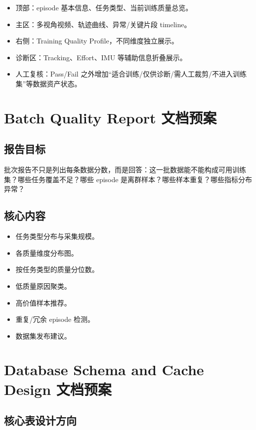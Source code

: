 \documentclass[UTF8,zihao=-4]{ctexart}
\begin{document}
\begin{itemize}
  \item 顶部：episode 基本信息、任务类型、当前训练质量总览。
  \item 主区：多视角视频、轨迹曲线、异常/关键片段 timeline。
  \item 右侧：Training Quality Profile，不同维度独立展示。
  \item 诊断区：Tracking、Effort、IMU 等辅助信息折叠展示。
  \item 人工复核：Pass/Fail 之外增加“适合训练/仅供诊断/需人工裁剪/不进入训练集”等数据资产状态。
\end{itemize}

\section{Batch Quality Report 文档预案}

\subsection{报告目标}

批次报告不只是列出每条数据分数，而是回答：这一批数据能不能构成可用训练集？哪些任务覆盖不足？哪些 episode 是离群样本？哪些样本重复？哪些指标分布异常？

\subsection{核心内容}

\begin{itemize}
  \item 任务类型分布与采集规模。
  \item 各质量维度分布图。
  \item 按任务类型的质量分位数。
  \item 低质量原因聚类。
  \item 高价值样本推荐。
  \item 重复/冗余 episode 检测。
  \item 数据集发布建议。
\end{itemize}

\section{Database Schema and Cache Design 文档预案}

\subsection{核心表设计方向}
\end{document}
